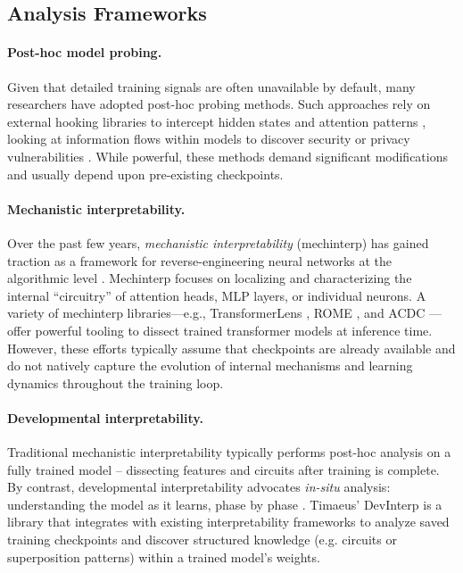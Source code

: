 \subsection{Analysis Frameworks}

\paragraph{Post-hoc model probing.} Given that detailed training signals are often unavailable by default, many researchers have adopted post-hoc probing methods. Such approaches rely on external hooking libraries to intercept hidden states and attention patterns \cite{voita2019analyzing, clark2019does, michel2019sixteen}, looking at information flows within models to discover security or privacy vulnerabilities \cite{roger2023negativelyreinforced, yao2024privacysurvey}. While powerful, these methods demand significant modifications and usually depend upon pre-existing checkpoints.%

\paragraph{Mechanistic interpretability.} Over the past few years, \emph{mechanistic interpretability} (mechinterp) has gained traction as a framework for reverse-engineering neural networks at the algorithmic level \cite{olah2020zoom, elhage2021mathematical}. Mechinterp focuses on localizing and characterizing the internal “circuitry” of attention heads, MLP layers, or individual neurons. A variety of mechinterp libraries—e.g., TransformerLens \cite{nanda2022transformerlens}, ROME \cite{meng2022locating}, and ACDC \cite{conmy2023towards}—offer powerful tooling to dissect trained transformer models at inference time. However, these efforts typically assume that checkpoints are already available and do not natively capture the evolution of internal mechanisms and learning dynamics throughout the training loop.

\vspace{-0.2cm}
\paragraph{Developmental interpretability.} Traditional mechanistic interpretability typically performs post-hoc analysis on a fully trained model – dissecting features and circuits after training is complete. By contrast, developmental interpretability advocates \textit{in-situ} analysis: understanding the model as it learns, phase by phase \cite{hoogland2023towards,devinterpcode, hoogland2025losslandscape}. Timaeus' DevInterp \cite{devinterpcode} is a library that integrates with existing interpretability frameworks to analyze saved training checkpoints and discover structured knowledge (e.g. circuits or superposition patterns) within a trained model’s weights. 

